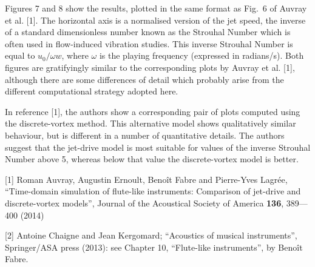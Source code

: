   Figures 7 and 8 show the results, plotted in the same format as Fig.\ 6 of 
  Auvray et al. [1]. The horizontal axis is a normalised version of the jet 
  speed, the inverse of a standard dimensionless number known as the Strouhal 
  Number which is often used in flow-induced vibration studies. This inverse 
  Strouhal Number is equal to $u_0/\omega w$, where $\omega$ is the playing 
  frequency (expressed in radians/s). Both figures are gratifyingly similar to 
  the corresponding plots by Auvray et al. [1], although there are some 
  differences of detail which probably arise from the different computational 
  strategy adopted here. 



  In reference [1], the authors show a corresponding pair of plots computed 
  using the discrete-vortex method. This alternative model shows qualitatively 
  similar behaviour, but is different in a number of quantitative details. The 
  authors suggest that the jet-drive model is most suitable for values of the 
  inverse Strouhal Number above 5, whereas below that value the discrete-vortex 
  model is better. 

  \sectionreferences{}[1] Roman Auvray, Augustin Ernoult, Benoît Fabre and 
  Pierre-Yves Lagrée, “Time-domain simulation of flute-like instruments: 
  Comparison of jet-drive and discrete-vortex models”, Journal of the 
  Acoustical Society of America \textbf{136}, 389—400 (2014) 

  [2] Antoine Chaigne and Jean Kergomard; “Acoustics of musical instruments”, 
  Springer/ASA press (2013): see Chapter 10, ``Flute-like instruments'', by 
  Benoît Fabre. 